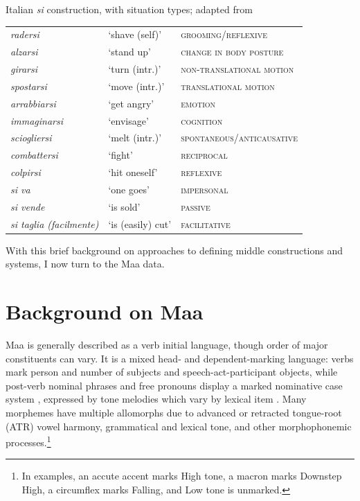 \documentclass[output=paper,colorlinks,citecolor=brown
]{langscibook}
\begin{document}

\ea Italian \textit{si} construction, with situation types; adapted from \citet[492]{Inglese2022a}\label{ex:Payne:Italian}\\
\begin{tabular}{lll}
\textit{radersi} & ‘shave (self)’ & \textsc{grooming/reflexive}\\
\textit{alzarsi} & ‘stand up’ & \textsc{change in body posture}\\
\textit{girarsi}& ‘turn (intr.)’ & \textsc{non-translational motion}\\
\textit{spostarsi} & ‘move (intr.)’ & \textsc{translational motion}\\
\textit{arrabbiarsi} & ‘get angry’ & \textsc{emotion}\\
\textit{immaginarsi} & ‘envisage’ & \textsc{cognition}\\
\textit{sciogliersi} & `melt (intr.)'  & \textsc{spontaneous/anticausative}\\
\textit{combattersi} & ‘fight’ & \textsc{reciprocal}\\
\textit{colpirsi} & ‘hit oneself’ & \textsc{reflexive}\\
\textit{si va} & ‘one goes’ & \textsc{impersonal}\\
\textit{si vende} & ‘is sold’ & \textsc{passive}\\
\textit{si taglia (facilmente)} & ‘is (easily) cut’ & \textsc{facilitative}\\
\end{tabular}
\z 

With this brief background on approaches to defining middle constructions and systems, I now turn to the Maa data.

\section{Background on Maa}\label{sec:Payne:MaaBackground}

Maa is generally described as a verb initial language, though order of major constituents can vary. It is a mixed head- and dependent-marking language: verbs mark person and number of subjects and speech-act-participant objects, while post-verb nominal phrases and free pronouns display a marked nominative case system \citep{Konig2006}, expressed by tone melodies which vary by lexical item \citep{TuckerMpaayei1955}. Many morphemes have multiple allomorphs due to advanced or retracted tongue-root (ATR) vowel harmony, grammatical and lexical tone, and other morphophonemic processes.\footnote{In examples, an accute accent marks High tone, a macron marks Downstep High, a circumflex marks Falling, and Low tone is unmarked.} 
\end{document}
